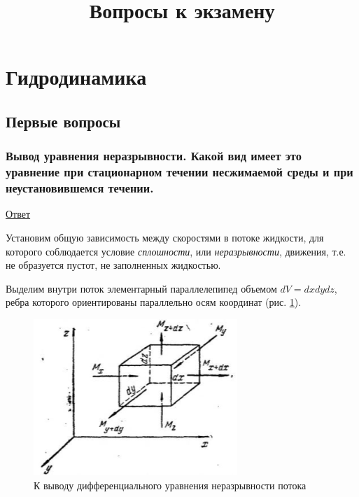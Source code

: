 \documentclass[12pt, a4paper]{article}
\title{Вопросы к экзамену}
\date{}
\begin{document}
	\maketitle

	\tableofcontents
	\newpage
	

	\section{Гидродинамика}
	\subsection{Первые вопросы}

	\subsubsection{Вывод уравнения неразрывности. Какой вид имеет это уравнение при стационарном течении несжимаемой среды и при неустановившемся течении.}
	\begin{center}
		\underline{Ответ}
	\end{center}
	\par Установим общую зависимость между скоростями в потоке жидкости, для которого соблюдается условие \textit{сплошности}, или \textit{неразрывности}, движения, т.е. не образуется пустот, не заполненных жидкостью.
	\par Выделим внутри поток элементарный параллелепипед объемом \( dV = dxdydz \), ребра которого ориентированы параллельно осям координат (рис. \ref{to_the_conclusion_of_the_differential_equation_of_continuity_of_the_flow}).
	\begin{figure}[H]
		\begin{center}
			\includegraphics{to_the_conclusion_of_the_differential_equation_of_continuity_of_the_flow.png}
			\caption{К выводу дифференциального уравнения неразрывности потока}
			\label{to_the_conclusion_of_the_differential_equation_of_continuity_of_the_flow}
		\end{center}
	\end{figure}
\end{document}
